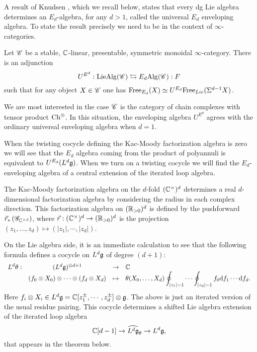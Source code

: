 A result of Knudsen \cite{KnudsenEn}, which we recall below, states that every dg Lie algebra determines an $E_d$-algebra, for any $d>1$, called the universal $E_d$ enveloping algebra.
To state the result precisely we need to be in the context of $\infty$-categories.

\begin{thm} Let $\mathscr C$ be a stable, $\mathbb C$-linear, presentable, symmetric monoidal $\infty$-category.
There is an adjunction
\[
U^{E^d} : {\rm LieAlg}(\mathscr C) \leftrightarrows E_d{\rm Alg} (\mathscr C): F
\]
such that for any object $X \in \mathscr C$ one has ${\rm Free}_{E_d}(X) \simeq U^{E_d} {\rm Free}_{Lie}(\Sigma^{d-1} X)$. 
\end{thm}

We are most interested in the case $\mathscr C$ is the category of chain complexes with tensor product ${\rm Ch}^{\otimes}$. 
In this situation, the enveloping algebra $U^{E^d}$ agrees with the ordinary universal enveloping algebra when $d=1$.

When the twisting cocycle defining the Kac-Moody factorization algebra is zero we will see that the $E_d$ algebra coming from the product of polyannuli is equivalent to $U^{E_d} (L^d \mathfrak g)$.
When we turn on a twisting cocycle we will find the $E_d$-enveloping algebra of a central extension of the iterated loop algebra. 

The Kac-Moody factorization algebra on the $d$-fold $(\mathbb C^\times)^d$ determines a real $d$-dimensional factorization algebra by considering the radius in each complex direction. 
This factorization algebra on $(\mathbb R_{>0})^d$ is defined by the pushforward $\vec{r}_*\left(\mathscr G_{\mathbb C^{\times d}}\right)$, 
where $\vec{r} : (\mathbb C^\times)^d \to (\mathbb R_{>0})^d$ is the projection $(z_1,\ldots,z_d) \mapsto (|z_1|, \cdots, |z_d|)$. 

On the Lie algebra side, it is an immediate calculation to see that the following formula defines a cocycle on $L^d \mathfrak g$ of degree $(d+1)$:
\[
\begin{array}{cccl}
\displaystyle L^d \theta : & (L^d \mathfrak g)^{\otimes d + 1} & \to & \mathbb C \\
\displaystyle & (f_0 \otimes X_0)\otimes \cdots \otimes (f_d \otimes X_d) & \mapsto & \displaystyle  \theta(X_0,\ldots,X_d)  \oint_{|z_1| = 1} \cdots \oint_{|z_d| = 1} f_0 {\rm d} f_1 \cdots {\rm d} f_d .
\end{array}
\]
Here $f_i \otimes X_i \in L^d \mathfrak g = \mathbb C[z_1^{\pm}, \cdots, z_d^{\pm}] \otimes \mathfrak g$. 
The above is just an iterated version of the usual residue pairing.
This cocycle determines a shifted Lie algebra extension of the iterated loop algebra
\[
\mathbb C[d-1] \to \widehat{L^d \mathfrak g}_\theta \to L^d \mathfrak g,
\]
that appears in the theorem below. 


